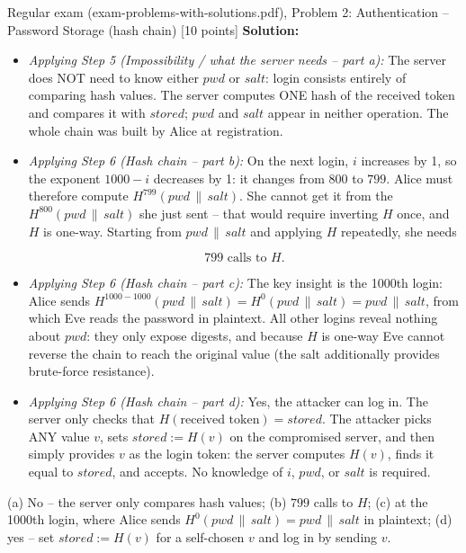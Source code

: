 \documentclass[12pt, a4paper]{article}
\begin{document}
\begin{practicebox}{Regular exam (exam-problems-with-solutions.pdf), Problem 2: Authentication -- Password Storage (hash chain) [10 points]}
\textbf{Solution:}
\begin{itemize}
    \item \textit{Applying Step 5 (Impossibility / what the server needs -- part a):} The server does NOT need to know either $pwd$ or $salt$: login consists entirely of comparing hash values. The server computes ONE hash of the received token and compares it with $stored$; $pwd$ and $salt$ appear in neither operation. The whole chain was built by Alice at registration.
    \item \textit{Applying Step 6 (Hash chain -- part b):} On the next login, $i$ increases by 1, so the exponent $1000 - i$ decreases by 1: it changes from $800$ to $799$. Alice must therefore compute $H^{799}(pwd \,\|\, salt)$.
    She cannot get it from the $H^{800}(pwd \,\|\, salt)$ she just sent -- that would require inverting $H$ once, and $H$ is one-way. Starting from $pwd \,\|\, salt$ and applying $H$ repeatedly, she needs

\[
799 \text{ calls to } H.
\]

\item \textit{Applying Step 6 (Hash chain -- part c):} The key insight is the 1000th login: Alice sends $H^{1000-1000}(pwd \,\|\, salt) = H^{0}(pwd \,\|\, salt) = pwd \,\|\, salt$, from which Eve reads the password in plaintext.
    All other logins reveal nothing about $pwd$: they only expose digests, and because $H$ is one-way Eve cannot reverse the chain to reach the original value (the salt additionally provides brute-force resistance).
    \item \textit{Applying Step 6 (Hash chain -- part d):} Yes, the attacker can log in. The server only checks that $H(\text{received token}) = stored$. The attacker picks ANY value $v$, sets $stored := H(v)$ on the compromised server, and then simply provides $v$ as the login token: the server computes $H(v)$, finds it equal to $stored$, and accepts. No knowledge of $i$, $pwd$, or $salt$ is required.
\end{itemize}

\begin{answerbox}
(a) No -- the server only compares hash values; (b) $799$ calls to $H$; (c) at the 1000th login, where Alice sends $H^{0}(pwd \,\|\, salt) = pwd \,\|\, salt$ in plaintext; (d) yes -- set $stored := H(v)$ for a self-chosen $v$ and log in by sending $v$.
\end{answerbox}
\end{practicebox}
\end{document}
